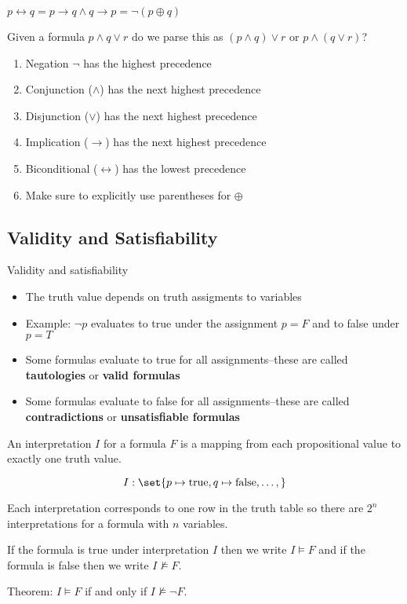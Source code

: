 \documentclass{scrreprt}
\newcommand{\true}{\text{true}}
\newcommand{\false}{\text{false}}
\begin{document}
\begin{definition}[Biconditionals]
	$p\leftrightarrow q = p\rightarrow q \land q\rightarrow p = \neg (p\oplus q)$
\end{definition}

\begin{example}
	Given a formula $p\land q \lor r$ do we parse this as $(p\land q)\lor r$ or $p\land (q\lor r)$?

	\begin{enumerate}
		\item Negation $\neg$ has the highest precedence
		\item Conjunction ($\land$) has the next highest precedence
		\item Disjunction ($\lor$) has the next highest precedence
		\item Implication ($\rightarrow$) has the next highest precedence
		\item Biconditional ($\leftrightarrow$) has the lowest precedence
		\item Make sure to explicitly use parentheses for $\oplus$
	\end{enumerate}
\end{example}

\subsection{Validity and Satisfiability}

Validity and satisfiability
\begin{itemize}
	\item The truth value depends on truth assigments to variables
	\item Example: $\neg p$ evaluates to true under the assignment $p=F$ and to false under $p=T$
	\item Some formulas evaluate to true for all assignments--these are called \textbf{tautologies} or \textbf{valid formulas}
	\item Some formulas evaluate to false for all assignments--these are called \textbf{contradictions} or \textbf{unsatisfiable formulas}
\end{itemize}

\begin{definition}[Interpretation]
	An interpretation $I$ for a formula $F$ is a mapping from each propositional
	value to exactly one truth value.

	\[
		I: \set{p\mapsto \true, q\mapsto \false, \ldots,}
	\]

	Each interpretation corresponds to one row in the truth table so there are $2^n$ interpretations for a formula with $n$ variables.

	If the formula is true under interpretation $I$ then we write $I\models F$ and if the formula is false then we write $I\not\models F$.

	Theorem: $I\models F$ if and only if $I\not\models \neg F$.
\end{definition}
\end{document}
